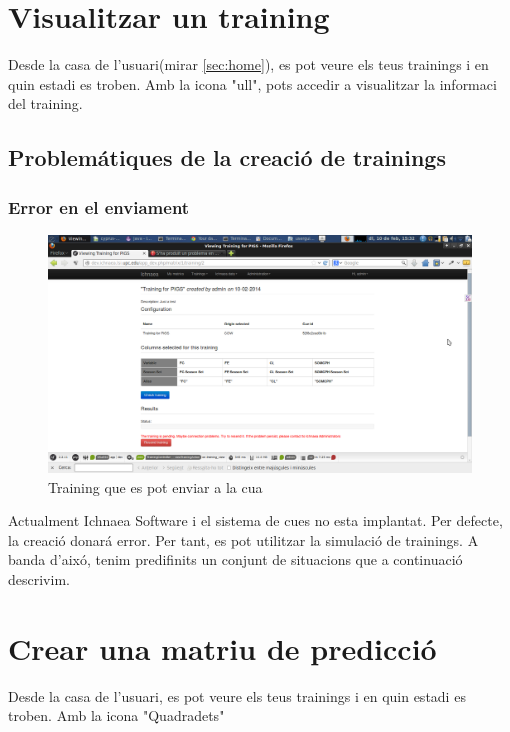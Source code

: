 \section{Visualitzar un training}
Desde la casa de l'usuari(mirar \ref{sec:home}), es pot veure els teus trainings i en quin estadi es troben. Amb la icona "ull", pots accedir a visualitzar la informaci del training.

\begin{itemize}
\end{itemize}

\subsection{Problem\'{a}tiques de la creaci\'{o} de trainings}
\subsubsection*{Error en el enviament}
\begin{figure}[h!]
  \centering
  \includegraphics[scale=0.2]{img/userguide/view_training_pending.png}
  \caption{Training que es pot enviar a la cua}
  \label{fig:placement}
\end{figure}

Actualment Ichnaea Software i el sistema de cues no esta implantat. Per defecte, la creaci\'{o} donar\'{a} error. Per tant, es pot utilitzar la simulaci\'{o} de trainings.
A banda d'aix\'{o}, tenim predifinits un conjunt de situacions que a continuaci\'{o} descrivim.

\section{Crear una matriu de predicci\'{o}}
Desde la casa de l'usuari, es pot veure els teus trainings i en quin estadi es troben. Amb la icona "Quadradets"


